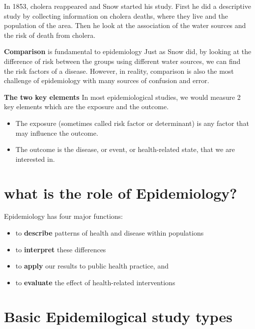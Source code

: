 \documentclass[
  letterpaper,
  DIV=11,
  numbers=noendperiod]{scrreprt}
\begin{document}
In 1853, cholera reappeared and Snow started his study. First he did a
descriptive study by collecting information on cholera deaths, where
they live and the population of the area. Then he look at the
association of the water sources and the risk of death from cholera.

\textbf{Comparison} is fundamental to epidemiology Just as Snow did, by
looking at the difference of risk between the groups using different
water sources, we can find the risk factors of a disease. However, in
reality, comparison is also the most challenge of epidemiology with many
sources of confusion and error.

\textbf{The two key elements} In most epidemiological studies, we would
measure 2 key elements which are the exposure and the outcome.

\begin{itemize}
\item
  The exposure (sometimes called risk factor or determinant) is any
  factor that may influence the outcome.
\item
  The outcome is the disease, or event, or health-related state, that we
  are interested in.
\end{itemize}

\hypertarget{what-is-the-role-of-epidemiology}{%
\section{what is the role of
Epidemiology?}\label{what-is-the-role-of-epidemiology}}

Epidemiology has four major functions:

\begin{itemize}
\item
  to \textbf{describe} patterns of health and disease within populations
\item
  to \textbf{interpret} these differences
\item
  to \textbf{apply} our results to public health practice, and
\item
  to \textbf{evaluate} the effect of health-related interventions
\end{itemize}

\hypertarget{basic-epidemilogical-study-types}{%
\section{Basic Epidemilogical study
types}\label{basic-epidemilogical-study-types}}
\end{document}
